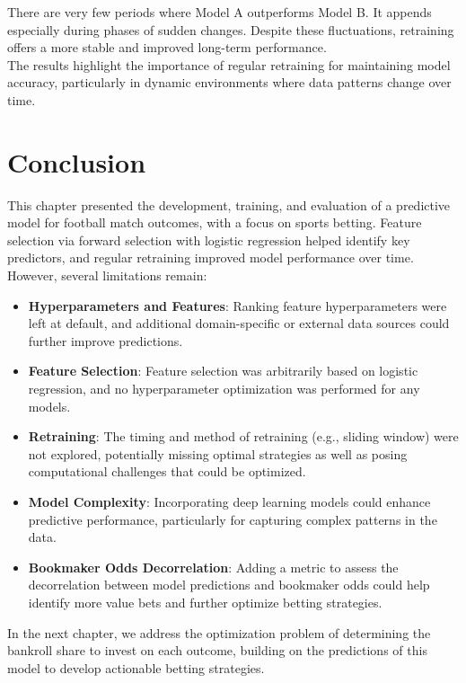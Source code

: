 There are very few periods where Model A outperforms Model B. It appends especially during phases of sudden changes. Despite these fluctuations, retraining offers a more stable and improved long-term performance. \\

The results highlight the importance of regular retraining for maintaining model accuracy, particularly in dynamic environments where data patterns change over time.

\section{Conclusion}

This chapter presented the development, training, and evaluation of a predictive model for football match outcomes, with a focus on sports betting. Feature selection via forward selection with logistic regression helped identify key predictors, and regular retraining improved model performance over time.\\

However, several limitations remain:

\begin{itemize}
    \item \textbf{Hyperparameters and Features}: Ranking feature hyperparameters were left at default, and additional domain-specific or external data sources could further improve predictions.
    \item \textbf{Feature Selection}: Feature selection was arbitrarily based on logistic regression, and no hyperparameter optimization was performed for any models.
    \item \textbf{Retraining}: The timing and method of retraining (e.g., sliding window) were not explored, potentially missing optimal strategies as well as posing computational challenges that could be optimized.
    \item \textbf{Model Complexity}: Incorporating deep learning models could enhance predictive performance, particularly for capturing complex patterns in the data.
    \item \textbf{Bookmaker Odds Decorrelation}: Adding a metric to assess the decorrelation between model predictions and bookmaker odds could help identify more value bets and further optimize betting strategies.
\end{itemize}
In the next chapter, we address the optimization problem of determining the bankroll share to invest on each outcome, building on the predictions of this model to develop actionable betting strategies.
